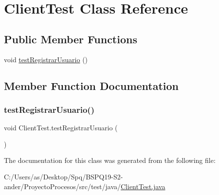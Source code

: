\hypertarget{class_client_test}{}\section{Client\+Test Class Reference}
\label{class_client_test}
\subsection*{Public Member Functions}
\begin{DoxyCompactItemize}
\item 
void \mbox{\hyperlink{class_client_test_a3ce212ac9c94011a253bb116f4237513}{test\+Registrar\+Usuario}} ()
\end{DoxyCompactItemize}


\subsection{Member Function Documentation}
\mbox{\label{class_client_test_a3ce212ac9c94011a253bb116f4237513}} 
\subsubsection{\texorpdfstring{testRegistrarUsuario()}{testRegistrarUsuario()}}
{\footnotesize\ttfamily void Client\+Test.\+test\+Registrar\+Usuario (\begin{DoxyParamCaption}{ }\end{DoxyParamCaption})}



The documentation for this class was generated from the following file\+:\begin{DoxyCompactItemize}
\item 
C\+:/\+Users/as/\+Desktop/\+Spq/\+B\+S\+P\+Q19-\/\+S2-\/ander/\+Proyecto\+Procesos/src/test/java/\mbox{\hyperlink{_client_test_8java}{Client\+Test.\+java}}\end{DoxyCompactItemize}
